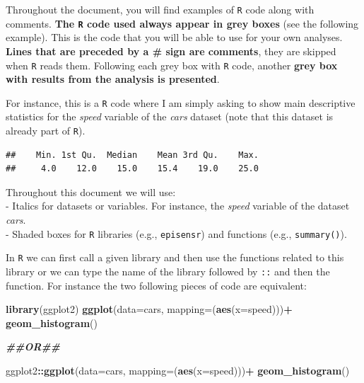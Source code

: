 \documentclass[
]{book}
\newenvironment{Shaded}{\begin{snugshade}}{\end{snugshade}}
\newcommand{\AttributeTok}[1]{\textcolor[rgb]{0.13,0.29,0.53}{#1}}
\newcommand{\CommentTok}[1]{\textcolor[rgb]{0.56,0.35,0.01}{\textit{#1}}}
\newcommand{\DocumentationTok}[1]{\textcolor[rgb]{0.56,0.35,0.01}{\textbf{\textit{#1}}}}
\newcommand{\FunctionTok}[1]{\textcolor[rgb]{0.13,0.29,0.53}{\textbf{#1}}}
\newcommand{\NormalTok}[1]{#1}
\newcommand{\SpecialCharTok}[1]{\textcolor[rgb]{0.81,0.36,0.00}{\textbf{#1}}}
\begin{document}
Throughout the document, you will find examples of \texttt{R} code along with comments. \textbf{The \texttt{R} code used always appear in grey boxes} (see the following example). This is the code that you will be able to use for your own analyses. \textbf{Lines that are preceded by a \# sign are comments}, they are skipped when \texttt{R} reads them. Following each grey box with \texttt{R} code, another \textbf{grey box with results from the analysis is presented}.

For instance, this is a \texttt{R} code where I am simply asking to show main descriptive statistics for the \emph{speed} variable of the \emph{cars} dataset (note that this dataset is already part of \texttt{R}).

\begin{Shaded}
\end{Shaded}

\begin{verbatim}
##    Min. 1st Qu.  Median    Mean 3rd Qu.    Max. 
##     4.0    12.0    15.0    15.4    19.0    25.0
\end{verbatim}

Throughout this document we will use:\\
- Italics for datasets or variables. For instance, the \emph{speed} variable of the dataset \emph{cars}.\\
- Shaded boxes for \texttt{R} libraries (e.g., \texttt{episensr}) and functions (e.g., \texttt{summary()}).

In \texttt{R} we can first call a given library and then use the functions related to this library or we can type the name of the library followed by \texttt{::} and then the function. For instance the two following pieces of code are equivalent:

\begin{Shaded}
\begin{Highlighting}[]
\FunctionTok{library}\NormalTok{(ggplot2)}
\FunctionTok{ggplot}\NormalTok{(}\AttributeTok{data=}\NormalTok{cars, }\AttributeTok{mapping=}\NormalTok{(}\FunctionTok{aes}\NormalTok{(}\AttributeTok{x=}\NormalTok{speed)))}\SpecialCharTok{+}
  \FunctionTok{geom\_histogram}\NormalTok{()}

\DocumentationTok{\#\#OR\#\#}

\NormalTok{ggplot2}\SpecialCharTok{::}\FunctionTok{ggplot}\NormalTok{(}\AttributeTok{data=}\NormalTok{cars, }\AttributeTok{mapping=}\NormalTok{(}\FunctionTok{aes}\NormalTok{(}\AttributeTok{x=}\NormalTok{speed)))}\SpecialCharTok{+}
  \FunctionTok{geom\_histogram}\NormalTok{()}
\end{Highlighting}
\end{Shaded}
\end{document}
